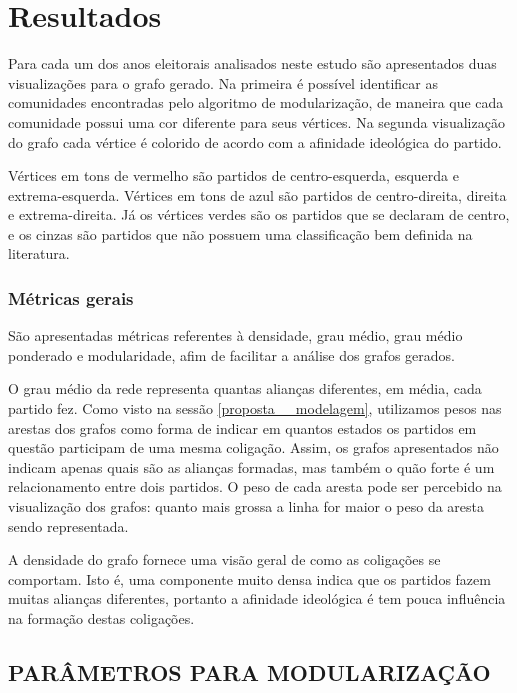 \chapter{Resultados}
\label{resultados}

Para cada um dos anos eleitorais analisados neste estudo são apresentados duas visualizações para o grafo gerado. Na primeira é possível identificar as comunidades encontradas pelo algoritmo de modularização, de maneira que cada comunidade possui uma cor diferente para seus vértices. Na segunda visualização do grafo cada vértice é colorido de acordo com a afinidade ideológica do partido.

Vértices em tons de vermelho são partidos de centro-esquerda, esquerda e extrema-esquerda. Vértices em tons de azul são partidos de centro-direita, direita e extrema-direita. Já os vértices verdes são os partidos que se declaram de centro, e os cinzas são partidos que não possuem uma classificação bem definida na literatura.

\subsection{Métricas gerais}
\label{proposta__objetivos-especificos--dados-gerais}

São apresentadas métricas referentes à densidade, grau médio, grau médio ponderado e modularidade, afim de facilitar a análise dos grafos gerados.


O grau médio da rede representa quantas alianças diferentes, em média, cada partido fez. Como visto na sessão \ref{proposta__modelagem}, utilizamos pesos nas arestas dos grafos como forma de indicar em quantos estados os partidos em questão participam de uma mesma coligação. Assim, os grafos apresentados não indicam apenas quais são as alianças formadas, mas também o quão forte é um relacionamento entre dois partidos. O peso de cada aresta pode ser percebido na visualização dos grafos: quanto mais grossa a linha for maior o peso da aresta sendo representada.

A densidade do grafo fornece uma visão geral de como as coligações se comportam. Isto é, uma componente muito densa indica que os partidos fazem muitas alianças diferentes, portanto a afinidade ideológica é tem pouca influência na formação destas coligações.

\section{\texorpdfstring{\MakeUppercase{Parâmetros para modularização}}{}}
\label{resultados__parametros-modularizacao}

